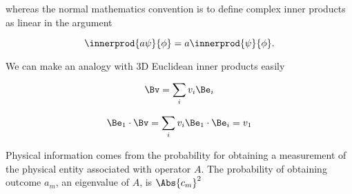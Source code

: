 whereas the normal mathematics convention is to define complex inner products as linear in the  argument

\begin{equation}\label{eqn:PHY356FLecture10:51f}
\innerprod{a \psi}{\phi} = a \innerprod{\psi}{\phi}.
\end{equation}

We can make an analogy with 3D Euclidean inner products easily

\begin{equation}\label{eqn:lecture5BigReviewCh1Formalism:91}
\begin{aligned}
\Bv = \sum_i v_i \Be_i
\end{aligned}
\end{equation}

\begin{equation}\label{eqn:lecture5BigReviewCh1Formalism:111}
\begin{aligned}
\Be_1 \cdot \Bv = \sum_i v_i \Be_1 \cdot \Be_i = v_1
\end{aligned}
\end{equation}

Physical information comes from the probability for obtaining a measurement of the physical entity associated with operator \(A\).  The probability of obtaining outcome \(a_m\), an eigenvalue of \(A\), is \(\Abs{c_m}^2\)

